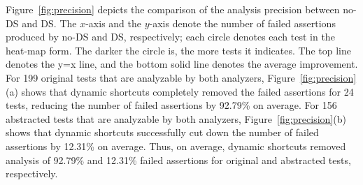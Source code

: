 Figure~\ref{fig:precision} depicts the comparison of the analysis
precision between no-DS and DS.  The $x$-axis and the $y$-axis denote
the number of failed assertions produced by no-DS and DS, respectively;
each circle denotes each test in the heat-map form. The darker the circle is, the more tests it indicates.
The top line
denotes the y=x line, and the bottom solid line denotes the average improvement.
For 199 original tests that are analyzable by both analyzers,
Figure~\ref{fig:precision}(a) shows that dynamic shortcuts
completely removed the failed assertions for 24 tests, reducing the number of failed assertions by 92.79\% on average.
For 156 abstracted tests that are analyzable by both analyzers,
Figure~\ref{fig:precision}(b) shows that dynamic shortcuts successfully cut down
the number of failed assertions by 12.31\% on average.
Thus, on average, dynamic shortcuts removed analysis of 92.79\% and 12.31\% failed assertions
for original and abstracted tests, respectively.
